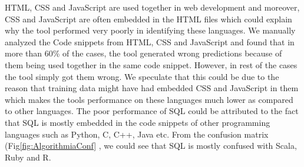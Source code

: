 \documentclass[letterpaper, 10 pt, conference]{ieeeconf}  %
\begin{document}
HTML, CSS and JavaScript are used together in web development and moreover, CSS and JavaScript are often embedded in the HTML files which could explain why the tool performed very poorly in identifying these languages. We manually analyzed the Code snippets from HTML, CSS and JavaScript and found that in more than 60\% of the cases, the tool generated wrong predictions because of them being used together in the same code snippet. However, in rest of the cases the tool simply got them wrong. We speculate that this could be due to the reason that training data might have had embedded CSS and JavaScript in them which makes the tools performance on these languages much lower as compared to other languages. The poor performance of SQL could be attributed to the fact that SQL is mostly embedded in the code snippets of other programming languages such as Python, C, C++, Java etc. From the confusion matrix (Fig\ref{fig:AlgorithmiaConf} , we could see that SQL is mostly confused with Scala, Ruby and R. 
\end{document}
